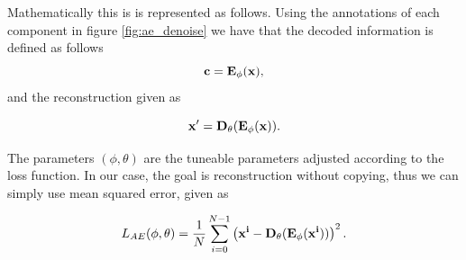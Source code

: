 Mathematically this is is represented as follows. Using the annotations of each component in figure \ref{fig:ae_denoise}
we have that the decoded information is defined as follows 
\begin{equation*}
    \bf{c} = E_{\phi}(\bf{x}),
\end{equation*}    
and the reconstruction given as 

\begin{equation*}
    \bf{x'} = D_{\theta}(E_{\phi}(\bf{x})).
\end{equation*}  

The parameters $(\phi,\theta)$ are the tuneable parameters adjusted according to the loss function. In our case, the goal is
reconstruction without copying, thus we can simply use mean squared error, given as 

\begin{equation}\label{eq:loss_ae}
    L_{AE} (\phi,\theta) = \frac{1}{N}\sum_{i=0}^{N-1} \left(\bf{x}^{i} - D_{\theta}(E_{\phi}(\bf{x}^{i}))\right)^{2}.
\end{equation}

